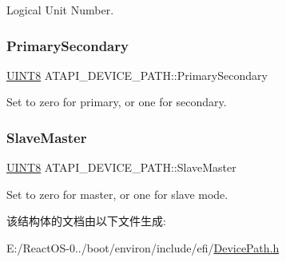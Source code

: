 Logical Unit Number. \mbox{\label{struct_a_t_a_p_i___d_e_v_i_c_e___p_a_t_h_a7058b930e5cbcaa9613de5455f653b87}} 
\subsubsection{\texorpdfstring{Primary\+Secondary}{PrimarySecondary}}
{\footnotesize\ttfamily \hyperlink{_processor_bind_8h_ab27e9918b538ce9d8ca692479b375b6a}{U\+I\+N\+T8} A\+T\+A\+P\+I\+\_\+\+D\+E\+V\+I\+C\+E\+\_\+\+P\+A\+T\+H\+::\+Primary\+Secondary}

Set to zero for primary, or one for secondary. \mbox{\label{struct_a_t_a_p_i___d_e_v_i_c_e___p_a_t_h_a8da558f34b328b52fc318af84c5a1d63}} 
\subsubsection{\texorpdfstring{Slave\+Master}{SlaveMaster}}
{\footnotesize\ttfamily \hyperlink{_processor_bind_8h_ab27e9918b538ce9d8ca692479b375b6a}{U\+I\+N\+T8} A\+T\+A\+P\+I\+\_\+\+D\+E\+V\+I\+C\+E\+\_\+\+P\+A\+T\+H\+::\+Slave\+Master}

Set to zero for master, or one for slave mode. 

该结构体的文档由以下文件生成\+:\begin{DoxyCompactItemize}
\item 
E\+:/\+React\+O\+S-\/0../boot/environ/include/efi/\hyperlink{_device_path_8h}{Device\+Path.\+h}\end{DoxyCompactItemize}

